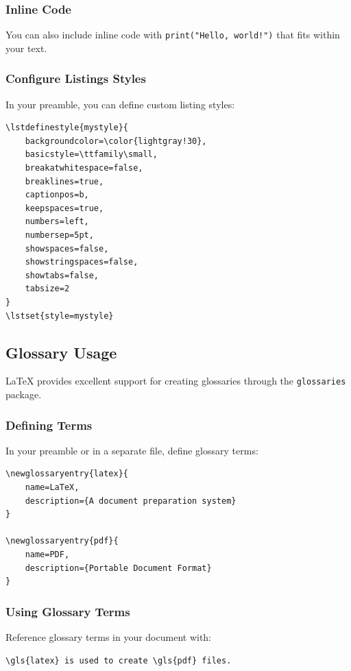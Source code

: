 \subsubsection{Inline Code}\label{subsubsec:inline-code}
You can also include inline code with \lstinline|print("Hello, world!")| that fits within your text.

\subsubsection{Configure Listings Styles}\label{subsubsec:listing-styles}
In your preamble, you can define custom listing styles:

\begin{verbatim}
\lstdefinestyle{mystyle}{
    backgroundcolor=\color{lightgray!30},
    basicstyle=\ttfamily\small,
    breakatwhitespace=false,
    breaklines=true,
    captionpos=b,
    keepspaces=true,
    numbers=left,
    numbersep=5pt,
    showspaces=false,
    showstringspaces=false,
    showtabs=false,
    tabsize=2
}
\lstset{style=mystyle}
\end{verbatim}

\subsection{Glossary Usage}\label{subsec:glossary-usage}
LaTeX provides excellent support for creating glossaries through the \texttt{glossaries} package.

\subsubsection{Defining Terms}\label{subsubsec:defining-terms}
In your preamble or in a separate file, define glossary terms:

\begin{verbatim}
\newglossaryentry{latex}{
    name=LaTeX,
    description={A document preparation system}
}

\newglossaryentry{pdf}{
    name=PDF,
    description={Portable Document Format}
}
\end{verbatim}

\subsubsection{Using Glossary Terms}\label{subsubsec:using-terms}
Reference glossary terms in your document with:

\begin{verbatim}
\gls{latex} is used to create \gls{pdf} files.
\end{verbatim}

